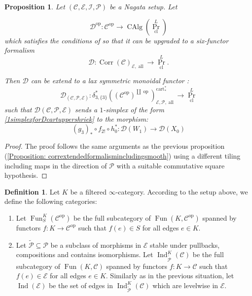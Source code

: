 \documentclass[14pt]{article}
\newtheorem{proposition}[theorem]{Proposition}
\theoremstyle{definition}
\newtheorem{definition}[theorem]{Definition}
\newcommand{\E}{\mathcal{E}}
\newcommand{\D}{\mathcal{D}}
\renewcommand{\P}{\mathcal{P}}
\newcommand{\op}[1]{\operatorname{#1}}
\newcommand{\I}{\mathscr{I}}
\newcommand{\Ca}{\mathcal{C}}
\numberwithin{subsection}{section}
\begin{document}
\begin{proposition}\label{Proposition: corrformalismextendingproper}
      Let $(\Ca,\E,\I,\P)$ be a Nagata setup. Let 

\begin{equation}
    \D^{\op{op}} : \Ca^{\op{op}} \to \op{CAlg}(\op{Pr}^{L}_{\op{cl}})
\end{equation}
which satisfies the conditions of \cite[Theorem 5.2.3]{chowdhury2025sixfunctorformalismsiiiconstruction} so that it can be upgraded to a six-functor formalism 
\begin{equation}
    \D : \op{Corr}(\Ca)_{\E,\op{all}} \to \op{Pr}^L_{\op{cl}}.
\end{equation}

Then $\D$ can be extend to a lax symmetric monoidal functor :
\begin{equation}
    \D_{(\Ca,\P,\E)} : \delta^*_{3,\{3\}}((\Ca^{\op{op}})^{\coprod\op{op}})^{\op{cart}^*_*}_{\E,\P,\op{all}} \to \op{Pr}^L_{\op{cl}}
\end{equation}
 such that $\D{(\Ca,\P,\E)}$ sends a $1$-simplex of the form \cref{1simplexforDcartuppershriek} to the morphism:
\begin{equation}
    (g_3)_* \circ f_{2!} \circ h_0^*: \D(W_1) \to \D(X_0) \end{equation}
\end{proposition}
\begin{proof}
    The proof follows the same arguments as the previous proposition (\cref{Proposition: corrextendedformalismincludingsmooth}) using a different tiling including maps in the direction of $\P$ with a suitable commutative square hypothesis. 
\end{proof}

    
\begin{definition}\label{definition:IndProcatdefinition}
    Let $K$ be a filtered $\infty$-category. According to the setup above, we define the following categories:
    \begin{enumerate}
        \item Let $\op{Fun}^K_S(\Ca^{\op{op}})$ be the full subcategory of $\op{Fun}(K,\Ca^{\op{op}})$ spanned by functors $f: K \to \Ca^{\op{op}}$ such that $f(e)\in S$ for all edges $e \in K$. 
         \item Let $\tilde{\P} \subseteq \P$ be a subclass of morphisms in $\E$ stable under pullbacks, compositions and contains isomorphisms. Let $\op{Ind}^K_{\tilde{\P}}(\Ca)$ be the full subcategory of $\op{Fun}(K,\Ca)$ spanned by functors $f: K \to \Ca$ such that $f(e) \in \E$ for all edges $e \in K$. Similarly as in the previous situation, let $\op{Ind}(\E)$ be the set of edges in $\op{Ind}^K_{\tilde{\P}}(\Ca)$ which are levelwise in $\E$.
    \end{enumerate}
\end{definition}
\end{document}
